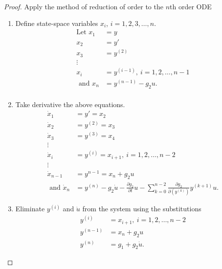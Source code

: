 \documentclass[12pt]{exam}
\renewenvironment{solution}%
{%
    \renewcommand{\proofname}{Solution}%
    \begin{proof}%
}{\end{proof}}
\theoremstyle{mytheoremstyle}
\begin{document}
\begin{solution}
    Apply the method of reduction of order to the $n$th order ODE
    \begin{enumerate}
    \item Define state-space variables $x_i$, $i = 1, 2, 3, \dots, n$.
    \begin{align*}
        \text{Let } x_1 &= y \\
        x_2 &= y' \\
        x_3 &= y^{(2)} \\
        \vdots \\
        x_i &= y^{(i-1)}, \ i = 1, 2, \dots, n-1\\
        \text{ and } x_n &= y^{(n-1)} - g_2 u.\\
    \end{align*}
    \item Take derivative the above equations. 
    \begin{align*}
        \dot{x}_1 &= y' = x_2\\
        \dot{x}_2 &= y^{(2)} = x_3\\
        \dot{x}_3 &= y^{(3)} = x_4 \\
        \vdots \\
        \dot{x}_i &= y^{(i)} = x_{i+1}, \ i = 1, 2, \dots, n-2\\
        \vdots\\
        \dot{x}_{n-1} &= y^{n-1} = x_n + g_2 u\\
        \text{ and } \dot{x}_n &= y^{(n)} - g_2 \dot{u} - \frac{\partial g_2}{\partial t} u - \sum_{k=0}^{n-2} \frac{\partial g_2}{\partial ( y^{(k)})} y^{(k+1)} u.
    \end{align*}

    \item Eliminate $y^{(i)}$ and $\dot{u}$ from the system using the substitutions
    \begin{align*}
        y^{(i)} &= x_{i+1}, \ i = 1, 2, \dots, n-2\\
        y^{(n-1)} &= x_n + g_2 u \\
        y^{(n)} &= g_1 + g_2 \dot{u}. 
    \end{align*}
    

\end{enumerate}
\end{solution}
\end{document}
